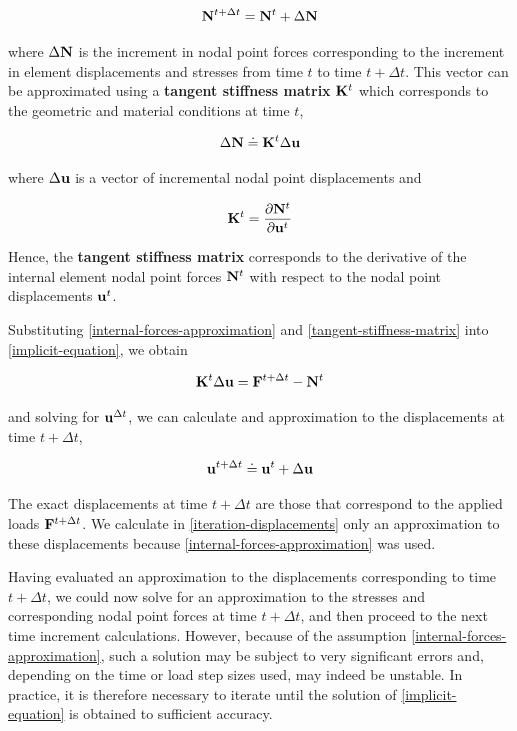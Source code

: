 \begin{equation}
    \mathbf{N}^{t+\Delta t} = \mathbf{N}^t + \Delta \mathbf{N}
\end{equation}

where $ \Delta \mathbf{N} $ is the increment in nodal point forces corresponding
to the increment in element displacements and stresses from time $ t $ to time
$ t + \Delta t $. This vector can be approximated using a \textbf{tangent stiffness matrix}
$ \mathbf{K}^t $ which corresponds to the geometric and material conditions
at time $ t $,

\begin{equation}\label{internal-forces-approximation}
    \Delta \mathbf{N} \doteq \mathbf{K}^{t} \Delta \mathbf{u}
\end{equation}

where $ \Delta \mathbf{u} $ is a vector of incremental nodal point displacements and

\begin{equation}\label{tangent-stiffness-matrix}
    \mathbf{K}^{t} = \frac{\partial \mathbf{N}^{t}}{\partial \mathbf{u}^{t}}
\end{equation}

Hence, the \textbf{tangent stiffness matrix} corresponds to the derivative of the
internal element nodal point forces $ \mathbf{N}^{t} $ with respect to the
nodal point displacements $ \mathbf{u}^{t} $.

Substituting \eqref{internal-forces-approximation} and
\eqref{tangent-stiffness-matrix} into \eqref{implicit-equation}, we obtain

\begin{equation}\label{iteration-equation}
    \mathbf{K}^{t} \Delta \mathbf{u} = \mathbf{F}^{t + \Delta t} - \mathbf{N}^{t}
\end{equation}

and solving for $ \mathbf{u}^{\Delta t} $, we can calculate and approximation
to the displacements at time $ t + \Delta t $,

\begin{equation}\label{iteration-displacements}
    \mathbf{u}^{t + \Delta t} \doteq \mathbf{u}^{t} + \Delta \mathbf{u}
\end{equation}

The exact displacements at time $ t + \Delta t $ are those that correspond to the
applied loads $ \mathbf{F}^{t + \Delta t} $. We calculate in \eqref{iteration-displacements}
only an approximation to these displacements because \eqref{internal-forces-approximation}
was used.

Having evaluated an approximation to the displacements corresponding to
time $ t + \Delta t $, we could now solve for an approximation to the stresses and
corresponding nodal point forces at time $ t + \Delta t $, and then proceed to the
next time increment calculations. However, because of the assumption
\eqref{internal-forces-approximation}, such a solution may be subject to
very significant errors and, depending on the time or load step sizes used, may
indeed be unstable. In practice, it is therefore necessary to iterate until the
solution of \eqref{implicit-equation} is obtained to sufficient accuracy.


